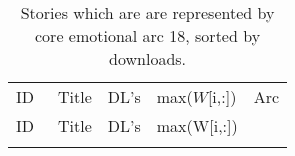 \begin{longtable}{l | l | l | l | c}
ID & ~Title & DL's & max($W$[i,:]) & Arc\\
ID & ~Title & DL's & max(W[i,:])\\
\hline
\endhead
\caption{Stories which are are represented by core emotional arc 18, sorted by downloads.}
\end{longtable}
